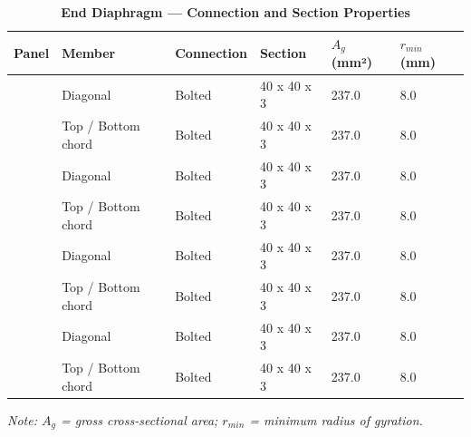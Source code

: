\documentclass[12pt,a4paper]{report}
\numberwithin{table}{chapter}
\numberwithin{figure}{chapter}
\begin{document}
\vspace{1em}

\vspace{0.4em}
\noindent
\setlength{\tabcolsep}{4pt}
\setlength{\LTleft}{0pt}
\setlength{\LTright}{\fill}

\begin{longtable}{|C{2.0cm}|L{2.0cm}|L{2.2cm}|C{2.5cm}|C{2.0cm}|C{2.0cm}|}
\caption{\textbf{End Diaphragm --- Connection and Section Properties}}
\hline
\textbf{Panel} & \textbf{Member} & \textbf{Connection} & \textbf{Section} & \textbf{$A_g$ (mm²)} & \textbf{$r_{min}$ (mm)} \\[6pt]
\hline
{} & Diagonal & Bolted & 40 x 40 x 3 & 237.0 & 8.0 \\[6pt]
 & Top / Bottom chord & Bolted & 40 x 40 x 3 & 237.0 & 8.0 \\[6pt]
\hline
{} & Diagonal & Bolted & 40 x 40 x 3 & 237.0 & 8.0 \\[6pt]
 & Top / Bottom chord & Bolted & 40 x 40 x 3 & 237.0 & 8.0 \\[6pt]
\hline
{} & Diagonal & Bolted & 40 x 40 x 3 & 237.0 & 8.0 \\[6pt]
 & Top / Bottom chord & Bolted & 40 x 40 x 3 & 237.0 & 8.0 \\[6pt]
\hline
{} & Diagonal & Bolted & 40 x 40 x 3 & 237.0 & 8.0 \\[6pt]
 & Top / Bottom chord & Bolted & 40 x 40 x 3 & 237.0 & 8.0 \\[6pt]
\hline
\end{longtable}
\noindent\textit{Note: $A_g$ = gross cross-sectional area; $r_{min}$ = minimum radius of gyration.}
\end{document}

